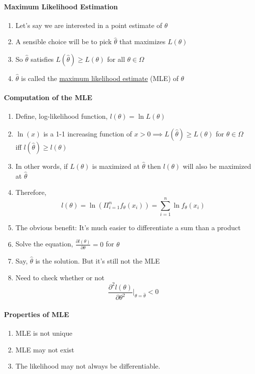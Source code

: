 \documentclass[11pt]{article}
\newcommand{\under}[1]{\underline{#1}}
\begin{document}
\paragraph{Maximum Likelihood Estimation}
\begin{enumerate}
	\item Let's say we are interested in a point estimate of $\theta$
	\item A sensible choice will be to pick $\hat{\theta}$ that maximizes $L(\theta)$
	\item So $\hat{\theta}$ satisfies $L(\hat{\theta}) \geq L(\theta)$ for all $\theta \in \Omega$
	\item $\hat{\theta}$ is called the \under{maximum likelihood estimate} (MLE) of $\theta$
\end{enumerate}
\paragraph{Computation of the MLE}
\begin{enumerate}
	\item Define, log-likelihood function, $l(\theta) = \ln{L(\theta)}$
	\item $\ln(x)$ is a 1-1 increasing function of $x > 0 \implies L(\hat{\theta}) \geq L(\theta)$ for $\theta \in \Omega$ iff $l(\hat{\theta}) \geq l(\theta)$
	\item In other words, if $L(\theta)$ is maximized at $\hat{\theta}$ then $l(\theta)$ will also be maximized at $\hat{\theta}$
	\item Therefore, $$l(\theta) = \ln{(\Pi_{i=1}^nf_\theta(x_i))} = \sum_{i=1}^n\ln{f_\theta(x_i)}$$
	\item The obvious benefit: It's much easier to differentiate a sum than a product
	\item Solve the equation, $\frac{\partial l(\theta)}{\partial \theta} = 0$ for $\theta$
	\item Say, $\hat{\theta}$ is the solution. But it's still not the MLE
	\item Need to check whether or not $$\frac{\partial^2 l(\theta)}{\partial \theta^2}\vert_{\theta = \hat{\theta}} < 0$$
\end{enumerate}
\paragraph{Properties of MLE}
\begin{enumerate}
	\item MLE is not unique
	\item MLE may not exist
	\item The likelihood may not always be differentiable.
\end{enumerate}
\end{document}
